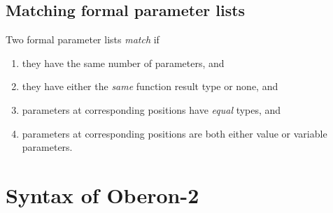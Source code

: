 \subsection{Matching formal parameter lists}

Two formal parameter lists {\em match} if
\begin{enumerate}
\item
they have the same number of parameters, and
\item
they have either the {\em same} function result type or none, and
\item
parameters at corresponding positions have {\em equal} types, and
\item
parameters at corresponding positions are both either
value or variable parameters.
\end{enumerate}

\section{Syntax of Oberon-2}

